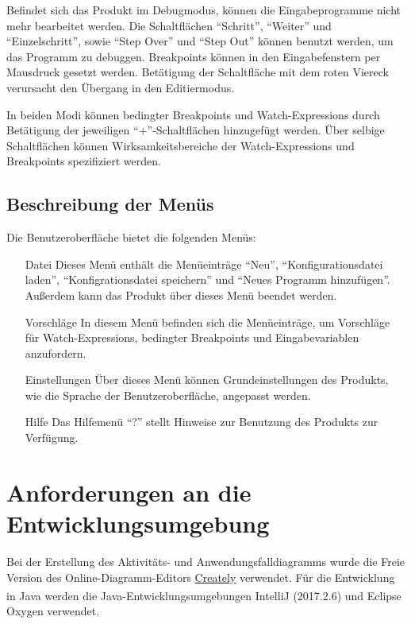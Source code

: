 \documentclass[parskip=full]{scrartcl}
\begin{document}
        Befindet sich das Produkt im \gls{Debugmodus}, können die Eingabeprogramme nicht mehr
        bearbeitet werden.
        Die Schaltflächen \enquote{Schritt}, \enquote{Weiter} und \enquote{Einzelschritt}, sowie \enquote{Step Over} und \enquote{Step Out} können
        benutzt werden, um das Programm zu debuggen. \glspl{Breakpoint} können in den Eingabefenstern per Mausdruck gesetzt werden.
        Betätigung der Schaltfläche mit dem roten Viereck verursacht den Übergang in den Editiermodus.

        In beiden Modi können \glspl{bedingter Breakpoint} und \glspl{Watch-Expression} durch Betätigung der jeweiligen 
        \enquote{+}-Schaltflächen hinzugefügt werden. Über selbige Schaltflächen können Wirksamkeitsbereiche der \glspl{Watch-Expression} und \glspl{Breakpoint}
        spezifiziert werden.\\
     \subsection{Beschreibung der Menüs}
     Die Benutzeroberfläche bietet die folgenden Menüs:
     \begin{itemize}
     \item[Datei] Dieses Menü enthält die Menüeinträge \enquote{Neu}, \enquote{Konfigurationsdatei laden}, \enquote{Konfigrationsdatei speichern} und \enquote{Neues Programm hinzufügen}. Außerdem kann das Produkt über dieses Menü beendet werden.
     \item[Vorschläge] In diesem Menü befinden sich die Menüeinträge, um Vorschläge für \glspl{Watch-Expression}, \glspl{bedingter Breakpoint} und Eingabevariablen anzufordern.
     \item[Einstellungen] Über dieses Menü können Grundeinstellungen des Produkts, wie die Sprache der Benutzeroberfläche, angepasst werden.
     \item[Hilfe] Das Hilfemenü \enquote{?} stellt Hinweise zur Benutzung des Produkts zur Verfügung.
     \end{itemize}
       
\section{Anforderungen an die Entwicklungsumgebung}
Bei der Erstellung des Aktivitäts- und Anwendungsfalldiagramms wurde die Freie Version des Online-Diagramm-Editors \href{https://creately.com/}{Creately} verwendet.
Für die Entwicklung in Java werden die Java-Entwicklungsumgebungen IntelliJ\textsuperscript{\textcopyright} (2017.2.6) und Eclipse\textsuperscript{\textcopyright} Oxygen verwendet.
\end{document}

